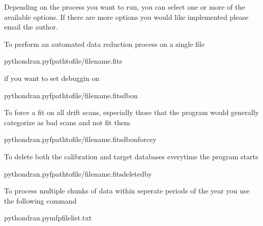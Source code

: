 \documentclass[letterpaper,10pt,english]{sphinxmanual}
\begin{document}
\sphinxAtStartPar
Depending on the process you want to run, you can select one or
more of the available options. If there are more options you would
like implemented please email the author.

\sphinxAtStartPar
To perform an automated data reduction process on a single file

\begin{sphinxVerbatim}[commandchars=\\\{\}]
\PYGZdl{}pythondran.py\PYGZhy{}fpath\PYGZhy{}to\PYGZhy{}file/filename.fits
\end{sphinxVerbatim}

\sphinxAtStartPar
if you want to set debuggin on

\begin{sphinxVerbatim}[commandchars=\\\{\}]
\PYGZdl{}pythondran.py\PYGZhy{}fpath\PYGZhy{}to\PYGZhy{}file/filename.fits\PYGZhy{}dbon
\end{sphinxVerbatim}

\sphinxAtStartPar
To force a fit on all drift scans, especially those that the
program would generally categorize as bad scans and not fit them

\begin{sphinxVerbatim}[commandchars=\\\{\}]
\PYGZdl{}pythondran.py\PYGZhy{}fpath\PYGZhy{}to\PYGZhy{}file/filename.fits\PYGZhy{}dbon\PYGZhy{}forcey
\end{sphinxVerbatim}

\sphinxAtStartPar
To delete both the calibration and target databases everytime the
program starts

\begin{sphinxVerbatim}[commandchars=\\\{\}]
\PYGZdl{}pythondran.py\PYGZhy{}fpath\PYGZhy{}to\PYGZhy{}file/filename.fits\PYGZhy{}delete\PYGZus{}dby
\end{sphinxVerbatim}

\sphinxAtStartPar
To process multiple chunks of data within seperate periods of the
year you use the following command

\begin{sphinxVerbatim}[commandchars=\\\{\}]
\PYGZdl{}pythondran.py\PYGZhy{}mfpfile\PYGZus{}list.txt
\end{sphinxVerbatim}
\end{document}
